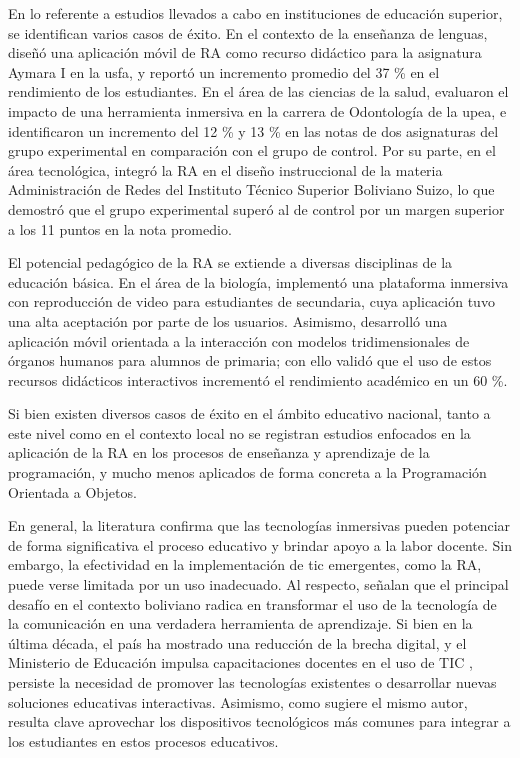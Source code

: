 En lo referente a estudios llevados a cabo en instituciones de educación superior, 
se identifican varios casos de éxito. En el contexto de la enseñanza de lenguas, 
\textcite{Castillo2020} diseñó una aplicación móvil de RA como recurso didáctico 
para la asignatura Aymara I en la \ac{usfa}, y reportó un incremento promedio del 
37 \% en el rendimiento de los estudiantes. En el área de las ciencias de la 
salud, \textcite{Silva2020} evaluaron el impacto de una herramienta inmersiva en 
la carrera de Odontología de la \ac{upea}, e identificaron un incremento del 
12 \% y 13 \% en las notas de dos asignaturas del grupo experimental en 
comparación con el grupo de control. Por su parte, en el área tecnológica, 
\textcite{Antequera2022} integró la RA en el diseño instruccional de la materia 
Administración de Redes del Instituto Técnico Superior Boliviano Suizo, lo que 
demostró que el grupo experimental superó al de control por un margen superior a 
los 11 puntos en la nota promedio.

El potencial pedagógico de la RA se extiende a diversas disciplinas de la 
educación básica. En el área de la biología, \textcite{Orias2021} implementó una 
plataforma inmersiva con reproducción de video para estudiantes de secundaria, 
cuya aplicación tuvo una alta aceptación por parte de los usuarios. Asimismo, 
\textcite{Usnayo2024} desarrolló una aplicación móvil orientada a la interacción 
con modelos tridimensionales de órganos humanos para alumnos de primaria; con 
ello validó que el uso de estos recursos didácticos interactivos incrementó el 
rendimiento académico en un 60 \%.
\vspace{1.15em}


Si bien existen diversos casos de éxito en el ámbito educativo nacional, tanto a 
este nivel como en el contexto local no se registran estudios enfocados en la 
aplicación de la RA en los procesos de enseñanza y aprendizaje de la programación, 
y mucho menos aplicados de forma concreta a la Programación Orientada a Objetos.
\vspace{1.15em}

En general, la literatura confirma que las tecnologías inmersivas pueden 
potenciar de forma significativa el proceso educativo y brindar apoyo a la 
labor docente. Sin embargo, la efectividad en la implementación de \ac{tic} 
emergentes, como la RA, puede verse limitada por un uso inadecuado. Al 
respecto, \textcite{CostasBlanco2020} señalan que el principal desafío en el 
contexto boliviano radica en transformar el uso de la tecnología de la 
comunicación en una verdadera herramienta de aprendizaje. Si bien en la última 
década, el país ha mostrado una reducción de la brecha digital, y el Ministerio 
de Educación impulsa capacitaciones docentes en el uso de TIC 
\parencite{Costas2020}, persiste la necesidad de promover las tecnologías 
existentes o desarrollar nuevas soluciones educativas interactivas. Asimismo,
como sugiere el mismo autor, resulta clave aprovechar los dispositivos 
tecnológicos más comunes para integrar a los estudiantes en estos procesos 
educativos.
